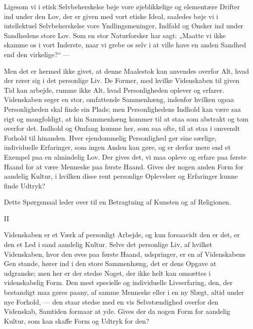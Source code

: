 \documentclass[12pt,a4paper,openany]{book}
\newcommand{\opage}[1]{\marginnote{\footnotesize\textit{[#1]}}}
\begin{document}
\setcounter{footnote}{0}%
\opage{7}Ligesom vi i etisk Selvbeherskelse bøje vore øjeblikkelige
og elementære Drifter ind under den Lov, der er given med
vort etiske Ideal, saaledes bøje vi i intellektuel Selvbeherskelse
vore Yndlingsmeninger, Indfald og Ønsker ind under Sandhedens
store Lov. Som en stor Naturforsker har sagt: „Maatte
vi ikke skamme os i vort Inderste, naar vi grebe os selv i at
ville have en anden Sandhed end den virkelige?“ ---

Men det er hermed ikke givet, at denne Maalestok kan
anvendes overfor Alt, hvad der rører sig i det personlige Liv.
De Former, med hvilke Videnskaben til given Tid kan arbejde,
rumme ikke Alt, hvad Personligheden oplever og erfarer.
Videnskaben søger en stor, omfattende Sammenhæng, indenfor
hvilken ogsaa Personligheden skal finde sin Plads; men Personlighedens
Indhold kan være saa rigt og mangfoldigt, at hin
Sammenhæng kommer til at staa som abstrakt og tom overfor
det. Indhold og Omfang komme her, som saa ofte, til at
staa i omvendt Forhold til hinanden. Hver ejendommelig Personlighed
gør sine særlige, individuelle Erfaringer, som ingen
Anden kan gøre, og er derfor mere end et Exempel paa en
almindelig Lov. Der gives det, vi maa opleve og erfare paa
første Haand for at være Menneske paa første Haand. Gives
der nogen anden Form for aandelig Kultur, i hvilken disse
rent personlige Oplevelser og Erfaringer kunne finde Udtryk?

Dette Spørgsmaal leder over til en Betragtning af Kunsten
og af Religionen.

\begin{center}II\end{center}


Videnskaben er et Værk af personligt Arbejde, og kun forsaavidt
den er det, er den et Led i sand aandelig Kultur.
Selve det personlige Liv, af hvilket Videnskaben, hvor den
øves paa første Haand, udspringer, er en af Videnskabens Gen%
\setcounter{footnote}{0}%
\opage{8}stande, hører ind i den store Sammenhæng, det er dens Opgave
at udgranske; men her er der stedse Noget, der ikke helt
kan omsættes i videnskabelig Form. Den mest specielle og
individuelle Livserfaring, den, der bestandigt maa gøres paany,
af samme Menneske eller i en ny Slægt, altid under nye Forhold,
--- den staar stedse med en vis Selvstændighed overfor
den Videnskab, Samtiden formaar at yde. Gives der da nogen
Form for aandelig Kultur, som kan skaffe Form og Udtryk
for den?
\end{document}
